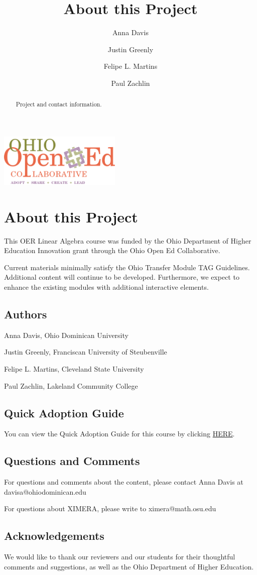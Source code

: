 \documentclass{ximera}
\author{Anna Davis \and Justin Greenly \and Felipe L. Martins \and Paul Zachlin}
\title{About this Project} \license{CC-BY 4.0}
\begin{document}
\begin{abstract}
 Project and contact information.
\end{abstract}
\maketitle

\begin{image}
\includegraphics[height=1in]{ooec.jpg}
\end{image}

\section{About this Project}
This OER Linear Algebra course was funded by the Ohio Department of Higher Education Innovation grant through the Ohio Open Ed Collaborative. 

Current materials minimally satisfy the Ohio Transfer Module TAG Guidelines.  Additional content will continue to be developed.  Furthermore, we expect to enhance the existing modules with additional interactive elements.

\subsection{Authors}
Anna Davis, Ohio Dominican University

Justin Greenly, Franciscan University of Steubenville

Felipe L. Martins, Cleveland State University

Paul Zachlin, Lakeland Community College

\subsection{Quick Adoption Guide}
You can view the Quick Adoption Guide for this course by clicking
\href{https://docs.google.com/document/d/10qFH0S0MzIWAvadk9WHzI1j8xbJg7CKQ0D2J0eVziCM/edit?usp=sharing}{HERE}.

\subsection{Questions and Comments}
For questions and comments about the content, please contact Anna Davis at davisa@ohiodominican.edu

For questions about XIMERA, please write to ximera@math.osu.edu

\subsection{Acknowledgements}
We would like to thank our reviewers and our students for their thoughtful comments and suggestions, as well as the Ohio Department of Higher Education.
\end{document}
